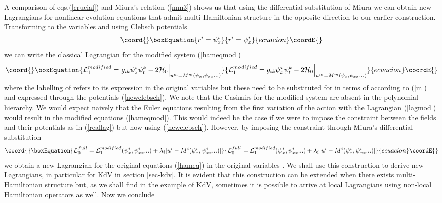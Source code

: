 \documentclass[a4paper,12pt]{article}
\begin{document}
A comparison of eqs.(\ref{crucial}) and Miura's relation
(\ref{mm3}) shows us that using the differential substitution of
Miura we can obtain new Lagrangians for nonlinear evolution
equations that admit multi-Hamiltonian structure in the opposite
direction to our earlier construction. Transforming to the
variables \coordHE{} and using Clebsch potentials
\begin{equation}\coord{}\boxEquation{
r^i = \psi_x^i \label{newclebsch}
}{
r^i = \psi_x^i }{ecuacion}\coordE{}\end{equation}
we can write the classical Lagrangian for the modified system
(\ref{hameqmod})
\begin{equation}\coord{}\boxEquation{
{\cal L}_1^{modified} = g_{ik} \psi_x^i  \psi_t^k - 2 {\cal H}_0
\Big|_{u^m=M^m(\psi_x,\psi_{xx}...) } \label{lagmod}
}{
{\cal L}_1^{modified} = g_{ik} \psi_x^i  \psi_t^k - 2 {\cal H}_0
\Big|_{u^m=M^m(\psi_x,\psi_{xx}...) } }{ecuacion}\coordE{}\end{equation}
where the labelling of \coordHE{} refers to its expression in
the original variables \coordHE{} but these need to be substituted for
in terms of \coordHE{} according to (\ref{m}) and expressed through the
potentials (\ref{newclebsch}). We note that the Casimirs \coordHE{} for the modified system are absent in the polynomial
\coordHE{} hierarchy. We would expect naively that the
Euler equations resulting from the first variation of the action
with the Lagrangian (\ref{lagmod}) would result in the modified
equations (\ref{hameqmod}). This would indeed be the case if we
were to impose the constraint between the fields \coordHE{} and their
potentials \coordHE{} as in (\ref{reallag}) but now using
(\ref{newclebsch}). However, by imposing the constraint through
Miura's differential substitution
\begin{equation}\coord{}\boxEquation{
{\cal L}_0^{full} = {\cal L}_1^{modified}( \psi^i_x,
\psi^i_{xx}...) + \lambda_i [ u^i - M^i(\psi^i_x,\psi^i_{xx}...) ]
\label{reallag2}
}{
{\cal L}_0^{full} = {\cal L}_1^{modified}( \psi^i_x,
\psi^i_{xx}...) + \lambda_i [ u^i - M^i(\psi^i_x,\psi^i_{xx}...) ]
}{ecuacion}\coordE{}\end{equation}
we obtain a new Lagrangian for the original equations
(\ref{hameq}) in the original variables \coordHE{}. We shall use this
construction to derive new Lagrangians, in particular for KdV in
section \ref{sec-kdv}. It is evident that this construction can be
extended when there exists multi-Hamiltonian structure but, as we
shall find in the example of KdV, sometimes it is possible to
arrive at local Lagrangians using non-local Hamiltonian operators
as well. Now we conclude
\end{document}
